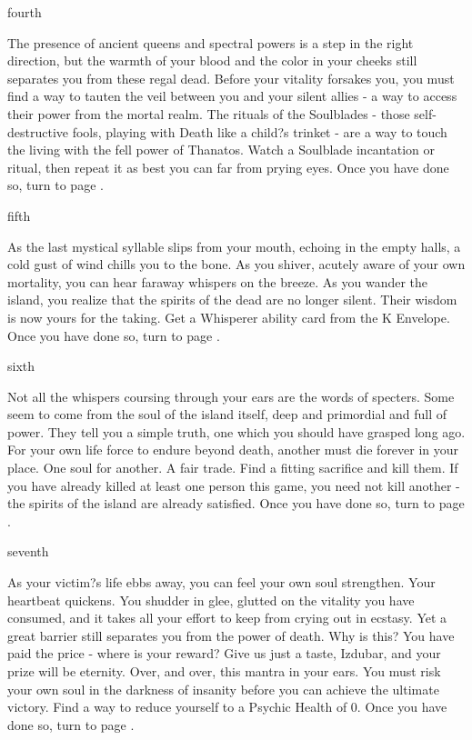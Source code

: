 \documentclass[greennotebook]{Kos}
\begin{document}
\begin{page}{fourth}

The presence of ancient queens and spectral powers is a step in the right direction, but the warmth of your blood and the color in your cheeks still separates you from these regal dead. Before your vitality forsakes you, you must find a way to tauten the veil between you and your silent allies - a way to access their power from the mortal realm. The rituals of the Soulblades - those self-destructive fools, playing with Death like a child?s trinket - are a way to touch the living with the fell power of Thanatos. Watch a Soulblade incantation or ritual, then repeat it as best you can far from prying eyes. Once you have done so, turn to page .

\end{page}

\begin{page}{fifth}

As the last mystical syllable slips from your mouth, echoing in the empty halls, a cold gust of wind chills you to the bone. As you shiver, acutely aware of your own mortality, you can hear faraway whispers on the breeze. As you wander the island, you realize that the spirits of the dead are no longer silent. Their wisdom is now yours for the taking. Get a Whisperer ability card from the K Envelope. Once you have done so, turn to page .

\end{page}

\begin{page}{sixth}

Not all the whispers coursing through your ears are the words of specters. Some seem to come from the soul of the island itself, deep and primordial and full of power. They tell you a simple truth, one which you should have grasped long ago. For your own life force to endure beyond death, another must die forever in your place. One soul for another. A fair trade. Find a fitting sacrifice and kill them. If you have already killed at least one person this game, you need not kill another - the spirits of the island are already satisfied. Once you have done so, turn to page .

\end{page}

\begin{page}{seventh}

As your victim?s life ebbs away, you can feel your own soul strengthen. Your heartbeat quickens. You shudder in glee, glutted on the vitality you have consumed, and it takes all your effort to keep from crying out in ecstasy. Yet a great barrier still separates you from the power of death. Why is this? You have paid the price - where is your reward? Give us just a taste, Izdubar, and your prize will be eternity. Over, and over, this mantra in your ears. You must risk your own soul in the darkness of insanity before you can achieve the ultimate victory. Find a way to reduce yourself to a Psychic Health of 0. Once you have done so, turn to page .

\end{page}
\end{document}
